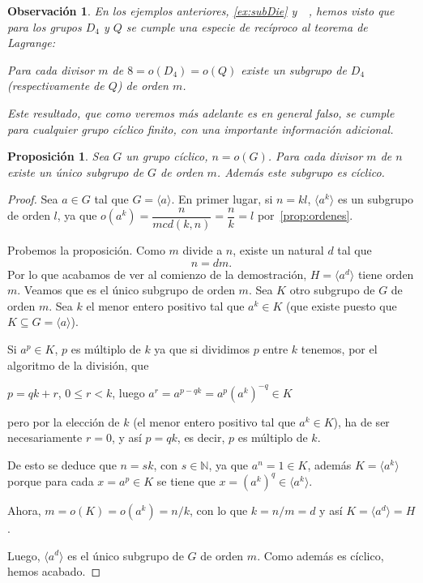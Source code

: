 \documentclass[12pt]{article}
\newtheorem{proposition}[theorem]{Proposición}
\newtheorem{observation}{Observación}[theorem]
\begin{document}
\begin{observation}En los ejemplos anteriores, \ref{ex:subDie} y~~, hemos visto que para los grupos $D_4$ y $Q$ se cumple una especie de recíproco al teorema de Lagrange:

Para cada divisor $m$ de $8 = o(D_4) = o(Q)$ existe un subgrupo de $D_4$ (respectivamente de $Q$) de orden $m$.

Este resultado, que como veremos más adelante es en general falso, se cumple para cualquier grupo cíclico finito, con una importante información adicional.
\end{observation}

\begin{proposition}Sea $G$ un grupo cíclico, $n = o(G)$. Para cada divisor $m$ de $n$ existe un único subgrupo de $G$ de orden $m$. Además este subgrupo es cíclico.
\end{proposition}
\begin{proof}
Sea $a \in G$ tal que $G = \langle a \rangle$. En primer lugar, 
si $n= kl$, $\langle a^{k} \rangle$ es un subgrupo de orden $l$, ya que $o(a^{k}) = \dfrac{n}{mcd(k,n)} = \dfrac{n}{k} = l$ por~\ref{prop:ordenes}.

Probemos la proposición. Como $m$ divide a $n$, existe un natural $d$ tal que $$n = dm.$$
Por lo que acabamos de ver al comienzo de la demostración, $H = \langle a^{d} \rangle$ tiene orden $m$. Veamos que es el único subgrupo de orden $m$. Sea $K$ otro subgrupo de $G$ de orden $m$. Sea $k$ el menor entero positivo tal que $a^{k} \in K$ (que existe puesto que $K \subseteq G = \langle a \rangle$).

Si $a^{p} \in K$, $p$ es múltiplo de $k$ ya que si dividimos $p$ entre $k$ tenemos, por el algoritmo de la división, que 
\begin{center}
$p = qk + r$, $0 \leq r < k$, luego $a^{r} = a^{p-qk} = a^{p}(a^{k})^{-q} \in K$
\end{center}
pero por la elección de $k$ (el menor entero positivo tal que $a^{k} \in K$), ha de ser necesariamente $r = 0$, y así $p= qk$, es decir, $p$ es múltiplo de $k$.

De esto se deduce que $n= sk$, con $s \in \mathbb{N}$, ya que $a^{n} = 1 \in K$, además $K = \langle a^{k} \rangle$ porque para cada $x = a^{p} \in K$ se tiene que $x = (a^{k})^{q} \in \langle a^{k} \rangle$.

Ahora, $m = o(K) = o(a^{k}) = n/k$, con lo que $k = n/m = d$ y así $K = \langle a^{d} \rangle = H$.

Luego, $\langle a^{d} \rangle$ es el único subgrupo de $G$ de orden $m$. Como además es cíclico, hemos acabado.

\end{proof}
\end{document}
